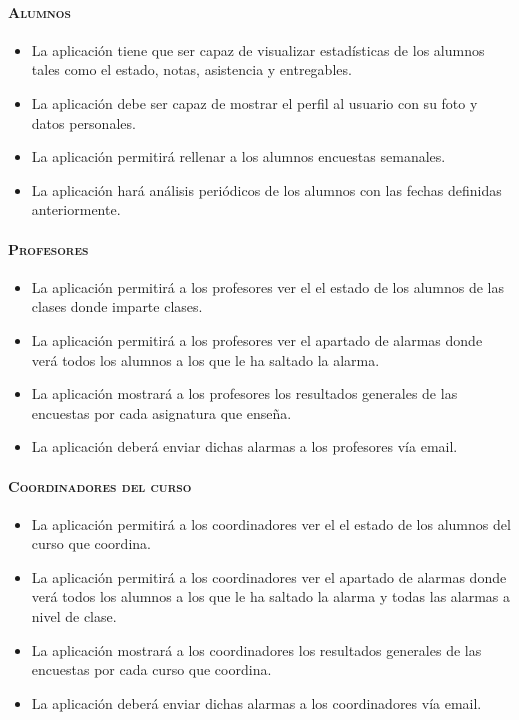 \paragraph{\textsc {Alumnos}}
\begin{itemize}
\item {La aplicación tiene que ser capaz de visualizar estadísticas de los alumnos tales como el estado, notas, asistencia y entregables.}
\item {La aplicación debe ser capaz de mostrar el perfil al usuario con su foto y datos personales.}
\item {La aplicación permitirá rellenar a los alumnos encuestas semanales.}
\item {La aplicación hará análisis periódicos de los alumnos con las fechas definidas anteriormente.}
\end{itemize}
\paragraph{\textsc {Profesores}}
\begin{itemize}
\item {La aplicación permitirá a los profesores ver el el estado de los alumnos de las clases donde imparte clases.}
\item {La aplicación permitirá a los profesores ver el apartado de alarmas donde verá todos los alumnos a los que le ha saltado la alarma.}
\item {La aplicación mostrará a los profesores los resultados generales de las encuestas por cada asignatura que enseña.}
\item {La aplicación deberá enviar dichas alarmas a los profesores vía email.}
\end{itemize}
\paragraph{\textsc {Coordinadores del curso}}
\begin{itemize}
\item {La aplicación permitirá a los coordinadores ver el el estado de los alumnos del curso que coordina.}
\item {La aplicación permitirá a los coordinadores ver el apartado de alarmas donde verá todos los alumnos a los que le ha saltado la alarma y todas las alarmas a nivel de clase.}
\item {La aplicación mostrará a los coordinadores los resultados generales de las encuestas por cada curso que coordina.}
\item {La aplicación deberá enviar dichas alarmas a los coordinadores vía email.}
\end{itemize}
